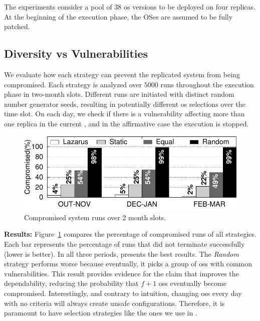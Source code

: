 The experiments consider a pool of 38 \gls{os} versions to be deployed on four replicas. 
At the beginning of the execution phase, the OSes are assumed to be fully patched.




\subsection*{Diversity vs Vulnerabilities}
We evaluate how each strategy can prevent the replicated system from being compromised. 
Each strategy is analyzed over $5000$ runs throughout the execution phase in two-month slots. 
Different runs are initiated with distinct random number generator seeds, resulting in potentially different \gls{os} selections over the time slot. 
On each day, we check if there is a vulnerability affecting more than one replica in the current \configuration, and in the affirmative case the execution is stopped.

\begin{figure}[h]
\begin{center}
\includegraphics[width=\columnwidth]{images/gnuplot/executions_new/execution.pdf}
\caption{Compromised system runs over 2 month slots.}
\label{fig:all_vulns}
\end{center}
\end{figure}

\textbf{Results:} Figure~\ref{fig:all_vulns} compares the percentage of compromised runs of all strategies. 
Each bar represents the percentage of runs that did not terminate successfully (lower is better). 
In all three periods, \system presents the best results. 
The \emph{Random} strategy performs worse because eventually, it picks a group of \glspl{os} with common vulnerabilities. 
This result provides evidence for the claim that \system improves the dependability, reducing the probability that $f+1$ \glspl{os} eventually become compromised. 
Interestingly, and contrary to intuition, changing \glspl{os} every day with no criteria will always create unsafe configurations.
Therefore, it is paramount to have selection strategies like the ones we use in \system.

